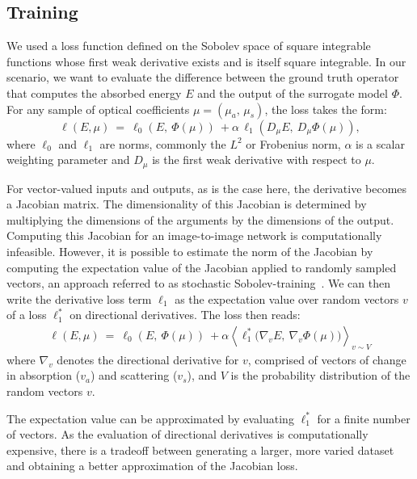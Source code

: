 \documentclass[journal,twoside,web]{ieeecolor}
\begin{document}
\subsection{Training}
We used a loss function defined on the Sobolev space of square integrable functions whose first weak derivative exists and is itself square integrable.
In our scenario, we want to evaluate the difference between the ground truth operator that computes the absorbed energy $E$ and the output of the surrogate model $\Phi$.
For any sample of optical coefficients $\mu=(\mu_a,\, \mu_s)$, the loss takes the form:
\begin{equation}
    \ell(E, \mu)\ =\ \ell_0(E,\ \Phi(\mu))\ + \alpha\, \ell_1(D_\mu E,\ D_\mu \Phi(\mu)),
    \label{eq:sobolev_image_loss}
\end{equation}
where $\ell_0$ and $\ell_1$ are norms, commonly the $L^2$ or Frobenius norm, $\alpha$ is a scalar weighting parameter and $D_\mu$ is the first weak derivative with respect to $\mu$. %
\par
For vector-valued inputs and outputs, as is the case here, the derivative becomes a Jacobian matrix. %
The dimensionality of this Jacobian is determined by multiplying the dimensions of the arguments by the dimensions of the output. %
Computing this Jacobian for an image-to-image network is computationally infeasible. %
However, it is possible to estimate the norm of the Jacobian by computing the expectation value of the Jacobian applied to randomly sampled vectors, an approach referred to as stochastic Sobolev-training~\cite{Czarnecki2017}. %
We can then write the derivative loss term $\ell_1$ as the expectation value over random vectors $v$ of a loss $\ell_1^*$ on directional derivatives. %
The loss then reads:
\begin{align}
    \ell\left(E, \mu\right)\ =\ \ell_0(E,\ \Phi(\mu))\ + \alpha\left\langle \ell_1^*\big(\nabla_v E,\ \nabla_v \Phi(\mu)\big)\right\rangle_{v \sim V}
    \label{eq:stoch_sobolev_loss}
\end{align}
where $\nabla_v$ denotes the directional derivative for $v$, comprised of vectors of change in absorption ($v_a$) and scattering ($v_s$), and $V$ is the probability distribution of the random vectors $v$. %
\par
The expectation value can be approximated by evaluating $\ell_1^*$ for a finite number of vectors. %
As the evaluation of directional derivatives is computationally expensive, there is a tradeoff between generating a larger, more varied dataset and obtaining a better approximation of the Jacobian loss. %
\end{document}
